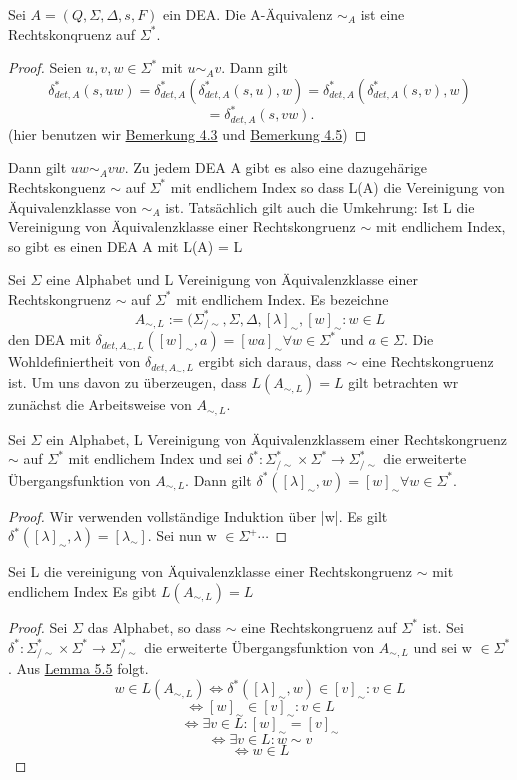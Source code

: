  Sei \(A = (Q, \Sigma, \Delta, s, F)\) ein DEA. Die A-Äquivalenz \(\sim_{A}\) ist eine Rechtskonqruenz auf \(\Sigma^{*}\).
  \begin{proof}
    Seien \(u, v, w \in \Sigma^{*}\) mit \(u \sim_{A} v\). Dann gilt 
    \[
      \delta_{det, A}^{*}(s, uw) = \delta_{det,A}^{*}(\delta_{det,A}^{*}(s, u), w) = \delta_{det,A}^{*}(\delta_{det,A}^{*}(s,v), w)\] \[= \delta_{det,A}^{*}(s, vw).
    \] 
    (hier benutzen wir \hyperref[subsec:4.3]{Bemerkung 4.3} und \hyperref[subsec:4.5]{Bemerkung 4.5})    
  \end{proof} 
  Dann gilt \(uw\sim_{A}vw\). Zu jedem DEA A gibt es also eine dazugehärige Rechtskonguenz \(\sim\) auf \(\Sigma^{*}\) mit endlichem Index so dass L(A) die Vereinigung von Äquivalenzklasse von \(\sim_{A}\) ist. Tatsächlich gilt auch die Umkehrung: Ist L die Vereinigung von Äquivalenzklasse einer Rechtskongruenz \(\sim\) mit endlichem Index, so gibt es einen DEA A mit L(A) = L

  Sei \(\Sigma\) eine Alphabet und L Vereinigung von Äquivalenzklasse einer Rechtskongruenz \(\sim\) auf \(\Sigma^{*}\) mit endlichem Index. Es bezeichne
  \[
    A_{\sim , L} := (\Sigma^{*}_{/\sim}, \Sigma, \Delta, [\lambda]_{\sim}, {[w]_{\sim} : w \in L}
  \]
  den DEA mit \(\delta_{det, A_{\sim}, L}([w]_{\sim}, a) = [wa]_{\sim} \forall w \in \Sigma^{*}\) und \(a \in \Sigma\). Die Wohldefiniertheit von \(\delta_{det, A_{\sim}, L}\) ergibt sich daraus, dass \(\sim\) eine Rechtskongruenz ist. Um uns davon zu überzeugen, dass \(L(A_{\sim, L}) = L\) gilt betrachten wr zunächst die Arbeitsweise von \(A_{\sim, L}\).

  Sei \(\Sigma\) ein Alphabet, L Vereinigung von Äquivalenzklassem einer Rechtskongruenz \(\sim\) auf \(\Sigma^{*}\) mit endlichem Index und sei \(\delta^{*} : \Sigma^{*}_{/\sim} \times \Sigma^{*} \rightarrow \Sigma^{*}_{/\sim}\) die erweiterte Übergangsfunktion von \(A_{\sim, L}\). Dann gilt \(\delta^{*}([\lambda]_{\sim}, w) = [w]_{\sim} \forall w \in \Sigma^{*}\). 
  \begin{proof}
    Wir verwenden vollständige Induktion über |w|. Es gilt \(\delta^{*}([\lambda]_{\sim}, \lambda) = [\lambda_{\sim}]\). Sei nun w \(\in \Sigma^{+} \cdots\)  
  \end{proof}

  Sei L die vereinigung von Äquivalenzklasse einer Rechtskongruenz \(\sim\) mit endlichem Index Es gibt \(L(A_{\sim, L}) = L\) 
  \begin{proof}
    Sei \(\Sigma\) das Alphabet, so dass \(\sim\) eine Rechtskongruenz auf \(\Sigma^{*}\) ist. Sei \(\delta^{*} : \Sigma^{*}_{/\sim} \times \Sigma^{*} \rightarrow \Sigma^{*}_{/\sim}\) die erweiterte Übergangsfunktion von \(A_{\sim, L}\) und sei w \(\in \Sigma^{*}\). Aus \hyperref[subsec:5.5]{Lemma 5.5} folgt. 
    \[w \in L(A_{\sim, L}) \Leftrightarrow \delta^{*}([\lambda]_{\sim}, w) \in {[v]_{\sim} : v \in L}\]
    \[\Leftrightarrow [w]_{\sim} \in {[v]_{\sim} : v\in L}\]
    \[\Leftrightarrow \exists v \in L : [w]_{\sim} = [v]_{\sim}\]
    \[\Leftrightarrow \exists v \in L : w \sim v\]
    \[\Leftrightarrow w \in L\]
  \end{proof}

